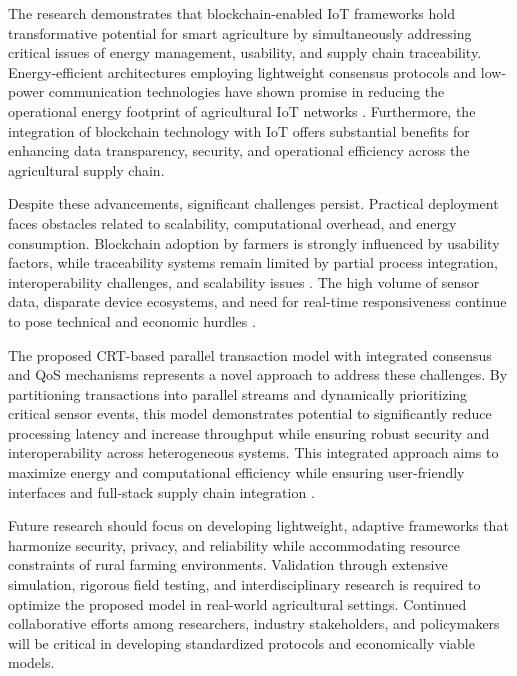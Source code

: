 \documentclass[12pt,onecolumn]{IEEEtran} %
\begin{document}
The research demonstrates that blockchain-enabled IoT frameworks hold transformative potential for smart agriculture by simultaneously addressing critical issues of energy management, usability, and supply chain traceability. Energy-efficient architectures employing lightweight consensus protocols and low-power communication technologies have shown promise in reducing the operational energy footprint of agricultural IoT networks \cite{munaganuri2025designofan, bapatla2023easychainaniotfriendly}. Furthermore, the integration of blockchain technology with IoT offers substantial benefits for enhancing data transparency, security, and operational efficiency across the agricultural supply chain.

Despite these advancements, significant challenges persist. Practical deployment faces obstacles related to scalability, computational overhead, and energy consumption. Blockchain adoption by farmers is strongly influenced by usability factors, while traceability systems remain limited by partial process integration, interoperability challenges, and scalability issues \cite{akella2023asystematicreview, mwewa2024blockchaintechnologya}. The high volume of sensor data, disparate device ecosystems, and need for real-time responsiveness continue to pose technical and economic hurdles \cite{huang2025digitaltraceabilityin, irfan2025aniotdrivensmart}. 

The proposed CRT-based parallel transaction model with integrated consensus and QoS mechanisms represents a novel approach to address these challenges. By partitioning transactions into parallel streams and dynamically prioritizing critical sensor events, this model demonstrates potential to significantly reduce processing latency and increase throughput while ensuring robust security and interoperability across heterogeneous systems. This integrated approach aims to maximize energy and computational efficiency while ensuring user-friendly interfaces and full-stack supply chain integration \cite{thiruvenkatasamy2025anonlinetool, singh2025blockchainandflbased}.

Future research should focus on developing lightweight, adaptive frameworks that harmonize security, privacy, and reliability while accommodating resource constraints of rural farming environments. Validation through extensive simulation, rigorous field testing, and interdisciplinary research is required to optimize the proposed model in real-world agricultural settings. Continued collaborative efforts among researchers, industry stakeholders, and policymakers will be critical in developing standardized protocols and economically viable models.
\end{document}
